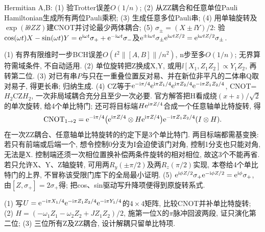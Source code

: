 \begin{exercise}Hermitian A,B: (1) 验Trotter误差$O(1/n)$; (2) 从ZZ耦合和任意单位Pauli Hamiltonian生成所有两位Pauli乘积; (3) 生成任意多位Pauli串; (4) 用单轴旋转及$\exp(\ii\theta ZZ)$建CNOT并讨论最少两体耦合; (5) $\sigma_\pm=(X\pm\ii Y)/2$: 验$\cos(\omega t)X-\sin(\omega t)Y=\mathrm e^{\mathrm i\omega t}\sigma_++\mathrm e^{-\mathrm i\omega t}\sigma_-$及$\mathrm e^{\pm\mathrm i\omega t}\sigma_\pm\mathrm e^{\mathrm i\omega tZ/2}=\mathrm e^{\mathrm i\omega tZ/2}\sigma_\pm$.\end{exercise}
\begin{solution}(1) 有界有限维时一步BCH误差$O(t^2\|[A,B]\|/n^2)$, n步至多$O(1/n)$; 无界算符需域条件, 不自动适用. (2) 单位旋转把Z换成X,Y, 或用$\ii[X_1, Z_1Z_2]\propto Y_1Z_2$, 再转第二位. (3) 对已有串$P$与只在一重叠位置反对易、并在新位非平凡的二体串Q取对易子, 得更长串; 归纳生成. (4) CZ等于$\mathrm e^{-\mathrm i\pi/4}\mathrm e^{\mathrm i\pi Z_1/4}\mathrm e^{\mathrm i\pi Z_2/4}\mathrm e^{-\mathrm i\pi Z_1Z_2/4}$, CNOT=$H_2$CZ$H_2$, 一次非局域耦合充分且至少一次必要. 官方解答把H看成绕$(x+z)/\sqrt2$的单次旋转, 给4个单比特门; 还可将目标端$H\mathrm e^{\mathrm i\pi Z/4}$合成一个任意轴单比特旋转, 得
\[\mathrm{CNOT}_{1\to2}=\mathrm e^{-\mathrm i\pi/4}\bigl(\mathrm e^{\mathrm i\pi Z/4}\otimes H\mathrm e^{\mathrm i\pi Z/4}\bigr)\mathrm e^{-\mathrm i\pi Z_1Z_2/4}(I\otimes H).\]
在一次ZZ耦合、任意轴单比特旋转的约定下是3个单比特门. 两目标端都需基变换: 若只有前端或后端一个, 想令控制0分支为I会迫使该门对角, 控制1分支也只能对角, 无法是X. 控制端还须一次相位置换补偿两条件旋转的相对相位, 故这3个不能再省. 若只允许X、Y、Z轴旋转, 可用两$R_y(\pm\pi/2)$及两$R_z(\pi/2)$实现, 本卷给4个单比特门的上界, 不冒称该受限门库下的全局最小证明.
(5) $\mathrm e^{\mathrm i\phi Z/2}\sigma_+\mathrm e^{-\mathrm i\phi Z/2}=\mathrm e^{\mathrm i\phi}\sigma_+$, 由$[Z,\sigma_+]=2\sigma_+$得; 把cos、sin驱动写升降项便得到原旋转系式.
\end{solution}
\begin{exercise}(1) 写$U=\mathrm e^{-\mathrm i\pi X_1/4}\mathrm e^{-\mathrm i\pi Z_1Z_2/4}\mathrm e^{-\mathrm i\pi Y_1/4}$的$4\times4$矩阵, 比较CNOT并补单比特旋转; (2) $H=(-\omega_1Z_1-\omega_2Z_2+JZ_1Z_2)/2$, 施第一位X的$\pi$脉冲回波两段, 证只演化第二位; (3) 三位所有Z及ZZ耦合, 设计解耦只留单比特项.\end{exercise}
